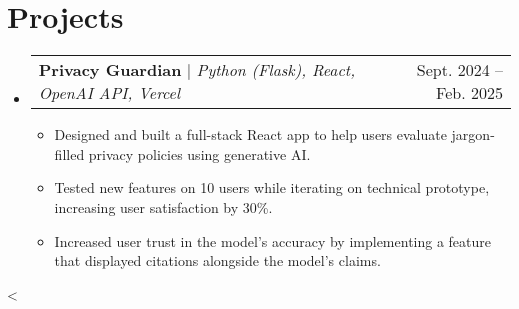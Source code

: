 \documentclass[letterpaper,11pt]{article}
\makeatletter
\newcommand{\resumeItem}[1]{
    \item\small{
            {#1 \vspace{-2pt}}
    }
}
\newcommand{\resumeProjectHeading}[2]{
    \item
    \begin{tabular*}{0.97\textwidth}{l@{\extracolsep{\fill}}r}
    \small#1 & #2 \\
    \end{tabular*}\vspace{-7pt}
}
\newcommand{\conditionalVspace}[1]{%
\ifnum\value{enumi}<\value{enumii}%
\vspace{#1}%
\fi
}
\newcommand{\resumeSubHeadingListStart}{\begin{itemize}[leftmargin=0.15in, label={}] \setlength{\itemsep}{7pt}}
\newcommand{\resumeSubHeadingListEnd}{\end{itemize}\conditionalVspace{7pt}}
\newcommand{\resumeItemListStart}{\begin{itemize}}
\newcommand{\resumeItemListEnd}{\end{itemize}\vspace{-5pt}}
\makeatother
\begin{document}
\section{Projects}
\resumeSubHeadingListStart
\resumeProjectHeading
{\textbf{Privacy Guardian} $|$ \emph{Python (Flask), React, OpenAI API, Vercel}}{Sept. 2024 -- Feb. 2025}
\resumeItemListStart
\resumeItem{Designed and built a full-stack React app to help users evaluate jargon-filled privacy policies using generative AI.}
\resumeItem{Tested new features on 10 users while iterating on technical prototype, increasing user satisfaction by 30\%.}
\resumeItem{Increased user trust in the model's accuracy by implementing a feature that displayed citations alongside the model's claims.}
\resumeItemListEnd
\resumeSubHeadingListEnd
\end{document}
